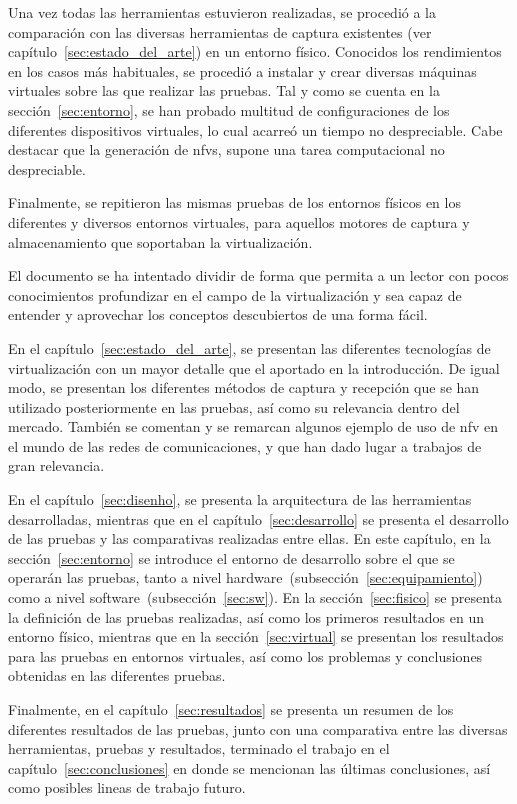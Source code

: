 Una vez todas las herramientas estuvieron realizadas, se procedió a la comparación con las diversas herramientas de captura existentes (ver capítulo~\ref{sec:estado_del_arte}) en un entorno físico. Conocidos los rendimientos en los casos más habituales, se procedió a instalar y crear diversas máquinas virtuales sobre las que realizar las pruebas. Tal y como se cuenta en la sección~\ref{sec:entorno}, se han probado multitud de configuraciones de los diferentes dispositivos virtuales, lo cual acarreó un tiempo no despreciable. Cabe destacar que la generación de \glspl{nfv}, supone una tarea computacional no despreciable.

Finalmente, se repitieron las mismas pruebas de los entornos físicos en los diferentes y diversos entornos virtuales, para aquellos motores de captura y almacenamiento que soportaban la virtualización.


El documento se ha intentado dividir de forma que permita a un lector con pocos conocimientos profundizar en el campo de la virtualización y sea capaz de entender y aprovechar los conceptos descubiertos de una forma fácil.

En el capítulo~\ref{sec:estado_del_arte}, se presentan las diferentes tecnologías de virtualización con un mayor detalle que el aportado en la introducción. De igual modo, se presentan los diferentes métodos de captura y recepción que se han utilizado posteriormente en las pruebas, así como su relevancia dentro del mercado. También se comentan y se remarcan algunos ejemplo de uso de \gls{nfv} en el mundo de las redes de comunicaciones, y que han dado lugar a trabajos de gran relevancia.

En el capítulo~\ref{sec:disenho}, se presenta la arquitectura de las herramientas desarrolladas, mientras que en el capítulo~\ref{sec:desarrollo} se presenta el desarrollo de las pruebas y las comparativas realizadas entre ellas.
En este capítulo, en la sección~\ref{sec:entorno} se introduce el entorno de desarrollo sobre el que se operarán las pruebas, tanto a nivel hardware~(subsección~\ref{sec:equipamiento}) como a nivel software~(subsección~\ref{sec:sw}).
En la sección~\ref{sec:fisico} se presenta la definición de las pruebas realizadas, así como los primeros resultados en un entorno físico, mientras que en la sección~\ref{sec:virtual} se presentan los resultados para las pruebas en entornos virtuales, así como los problemas y conclusiones obtenidas en las diferentes pruebas.

Finalmente, en el capítulo~\ref{sec:resultados} se presenta un resumen de los diferentes resultados de las pruebas, junto con una comparativa entre las diversas herramientas, pruebas y resultados, terminado el trabajo en el capítulo~\ref{sec:conclusiones} en donde se mencionan las últimas conclusiones, así como posibles lineas de trabajo futuro.
